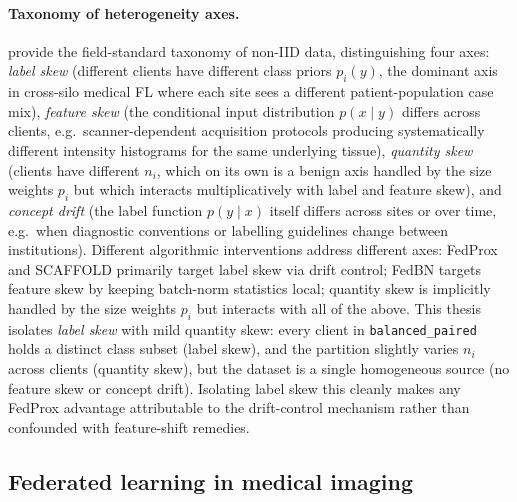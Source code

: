 \documentclass[11pt,a4paper]{article}
\begin{document}
\paragraph{Taxonomy of heterogeneity axes.}
\citet{kairouz2021advances} provide the field-standard taxonomy of non-IID
data, distinguishing four axes: \emph{label skew} (different clients have
different class priors $p_i(y)$, the dominant axis in cross-silo medical FL
where each site sees a different patient-population case mix),
\emph{feature skew} (the conditional input distribution $p(x \mid y)$
differs across clients, e.g.\ scanner-dependent acquisition protocols
producing systematically different intensity histograms for the same
underlying tissue), \emph{quantity skew} (clients have different $n_i$,
which on its own is a benign axis handled by the size weights $p_i$ but
which interacts multiplicatively with label and feature skew), and
\emph{concept drift} (the label function $p(y \mid x)$ itself differs
across sites or over time, e.g.\ when diagnostic conventions or labelling
guidelines change between institutions). Different algorithmic interventions address different
axes: FedProx and SCAFFOLD primarily target label skew via drift control;
FedBN \citep{li2021fedbn} targets feature skew by keeping batch-norm
statistics local; quantity skew is implicitly handled by the size weights
$p_i$ but interacts with all of the above. This thesis isolates \emph{label
skew} with mild quantity skew: every client in \texttt{balanced\_paired}
holds a distinct class subset (label skew), and the partition slightly
varies $n_i$ across clients (quantity skew), but the dataset is a single
homogeneous source (no feature skew or concept drift). Isolating label skew
this cleanly makes any FedProx advantage attributable to the drift-control
mechanism rather than confounded with feature-shift remedies.

\subsection{Federated learning in medical imaging}
\label{sec:rw-medicalfl}
\end{document}

